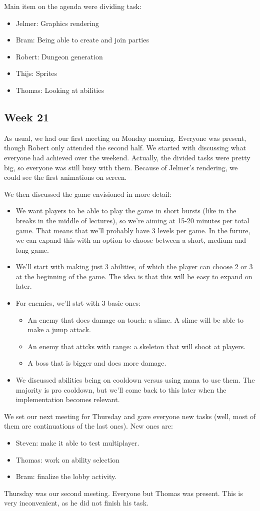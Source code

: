\documentclass[../main.tex]{subfiles}
\begin{document}
Main item on the agenda were dividing task:
\begin{itemize}
	\item Jelmer: Graphics rendering
	\item Bram: Being able to create and join parties
	\item Robert: Dungeon generation
	\item Thijs: Sprites
	\item Thomas: Looking at abilities
\end{itemize}

\subsection*{Week 21}
As usual, we had our first meeting on Monday morning. Everyone was present, though Robert only attended the second half. We started with discussing what everyone had achieved over the weekend. Actually, the divided tasks were pretty big, so everyone was still busy with them. Because of Jelmer's rendering, we could see the first animations on screen. 

We then discussed the game envisioned in more detail:
\begin{itemize}
	\item We want players to be able to play the game in short bursts (like in the breaks in the middle of lectures), so we're aiming at 15-20 minutes per total game. That means that we'll probably have 3 levels per game. In the furure, we can expand this with an option to choose between a short, medium and long game.
	\item We'll start with making just 3 abilities, of which the player can choose 2 or 3 at the beginning of the game. The idea is that this will be easy to expand on later.
	\item For enemies, we'll strt with 3 basic ones:
	\begin{itemize}
		\item An enemy that does damage on touch: a slime. A slime will be able to make a jump attack.
		\item An enemy that attcks with range: a skeleton that will shoot at players.
		\item A boss that is bigger and does more damage.
	\end{itemize}
	\item We discussed abilities being on cooldown versus using mana to use them. The majority is pro cooldown, but we'll come back to this later when the implementation becomes relevant.
\end{itemize}
We set our next meeting for Thursday and gave everyone new tasks (well, most of them are continuations of the last ones). New ones are:
\begin{itemize}
	\item Steven: make it able to test multiplayer.
	\item Thomas: work on ability selection
	\item Bram: finalize the lobby activity.
\end{itemize}
\bigbreak\noindent
Thursday was our second meeting. Everyone but Thomas was present. This is very inconvenient, as he did not finish his task.
\end{document}
